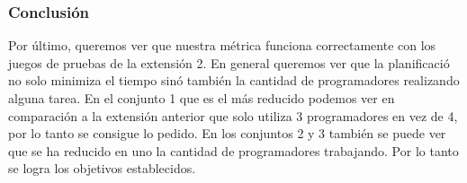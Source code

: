 \documentclass[12pt, titlepage]{article}
\begin{document}
\subsubsection{Conclusión}

Por último, queremos ver que nuestra métrica funciona correctamente con los juegos de pruebas de la extensión 2. En general queremos ver que la planificació no solo minimiza el tiempo sinó también la cantidad de programadores realizando alguna tarea. En el conjunto 1 que es el más reducido podemos ver en comparación a la extensión anterior que solo utiliza 3 programadores en vez de 4, por lo tanto se consigue lo pedido. En los conjuntos 2 y 3 también se puede ver que se ha reducido en uno la cantidad de programadores trabajando. Por lo tanto se logra los objetivos establecidos.
\end{document}
